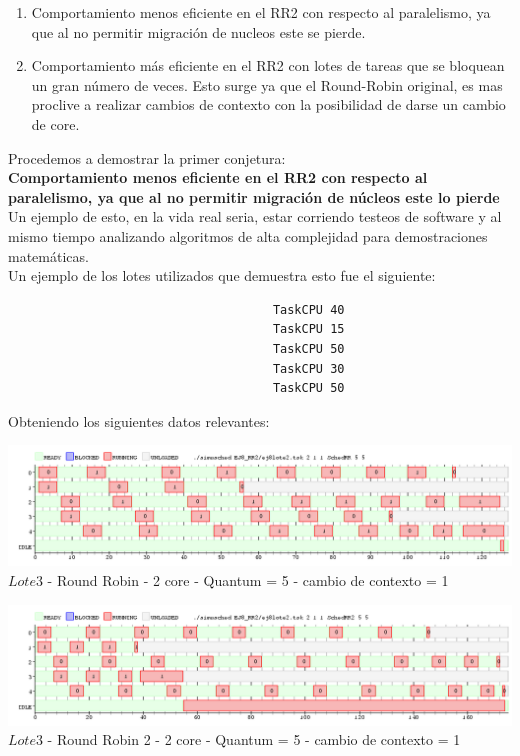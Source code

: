 \begin{enumerate}
\item Comportamiento menos eficiente en el RR2 con respecto al paralelismo, ya que al no permitir
migración de nucleos este se pierde.
\item Comportamiento más eficiente en el RR2 con lotes de tareas que se bloquean un gran n\'{u}mero
de veces. Esto surge ya que el Round-Robin original, es mas proclive a realizar cambios de contexto con la posibilidad
de darse un cambio de core.
\end{enumerate}
 
 Procedemos a demostrar la primer conjetura:\\
 
 \textbf{Comportamiento menos eficiente en el RR2 con respecto al paralelismo, ya que al no permitir
migración de núcleos este lo pierde}\\

Un ejemplo de esto, en la vida real seria, estar corriendo testeos de software y al mismo tiempo analizando
algoritmos de alta complejidad para demostraciones matem\'{a}ticas.\\

Un ejemplo de los lotes utilizados que demuestra esto fue el siguiente:\\

\begin{verbatim}
                                     TaskCPU 40
                                     TaskCPU 15
                                     TaskCPU 50
                                     TaskCPU 30
                                     TaskCPU 50
\end{verbatim}

Obteniendo los siguientes datos relevantes:\\

\begin{center}
    	\includegraphics[width=450pt]{./EJ8_RR2/dif10corerr.png}
	{$Lote 3$ - Round Robin - 2 core - Quantum = 5 - cambio de contexto = 1}	
 \end{center}
 
 \begin{center}
    	\includegraphics[width=450pt]{./EJ8_RR2/dif10corerr2.png}
	{$Lote 3$ - Round Robin 2 - 2 core - Quantum = 5 - cambio de contexto = 1}	
 \end{center}
 
